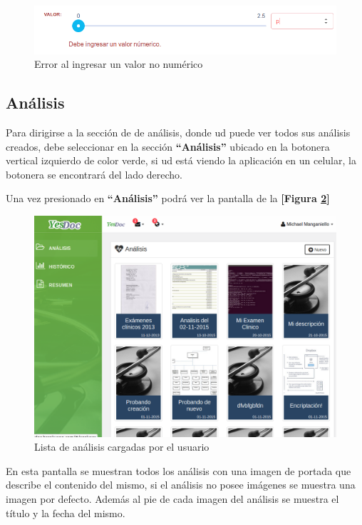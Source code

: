         
                \begin{figure}
                	\centering
                	\includegraphics[width=.8\textwidth]{img/manual_de_usuario/valor_no_numerico}
                	\caption{Error al ingresar un valor no numérico}
                	\label{mu-valor_no_numerico}
                \end{figure}
                
                
                
\subsection{Análisis}
Para dirigirse a la sección de  de análisis, donde ud puede ver todos sus análisis creados, debe seleccionar en la sección \textbf{``Análisis''} ubicado en la botonera vertical izquierdo de color verde, si ud está viendo la aplicación en un celular, la botonera se encontrará del lado derecho.

Una vez presionado en \textbf{``Análisis''} podrá ver la pantalla de la \textbf{[Figura \ref{mu-listar_analisis}]}


\begin{figure}
	\centering
	\includegraphics[width=.8\textwidth]{img/manual_de_usuario/listar_analisis}
	\caption{Lista de análisis cargadas por el usuario}
	\label{mu-listar_analisis}
\end{figure}
 
 
 En esta pantalla se muestran todos los análisis con una imagen de portada que describe  el contenido del mismo, si el análisis no posee imágenes se muestra una imagen por defecto. Además al pie de cada imagen del análisis se muestra el título y la fecha del mismo.
 

